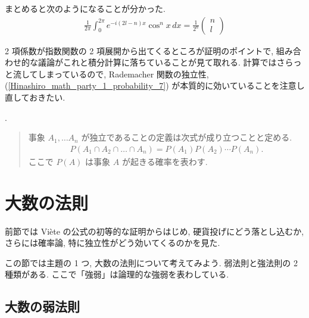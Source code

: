 \documentclass[openany, a4paper, oneside]{jsbook}
\begin{document}
{まとめると次のようになることが分かった.
\begin{align}
 \frac{1}{2 \pi} \int_0^{2 \pi} e^{-i (2l -n) x} \cos^n x \, dx
 =
 \frac{1}{2^n}
 \begin{pmatrix}
  n \\
  l
 \end{pmatrix} \label{Hinashiro_math_party_1_probability_9}
\end{align}

2 項係数が指数関数の 2 項展開から出てくるところが証明のポイントで,
組み合わせ的な議論がこれと積分計算に落ちていることが見て取れる.
計算ではさらっと流してしまっているので,
Rademacher 関数の独立性, (\ref{Hinashiro_math_party_1_probability_7}) が本質的に効いていることを注意し直しておきたい.}.
\begin{quote}
事象 $A_1, \dots A_n$ が独立であることの定義は次式が成り立つことと定める.
\begin{align}
 P (A_1 \cap A_2 \cap \dots \cap A_n)
 =
 P (A_1) P (A_2) \cdots P (A_n).
\end{align}
ここで $P (A)$ は事象 $A$ が起きる確率を表わす.
\end{quote}
\section{大数の法則}

前節では Vi\`ete の公式の初等的な証明からはじめ, 硬貨投げにどう落とし込むか,
さらには確率論, 特に独立性がどう効いてくるのかを見た.

この節では主題の 1 つ, 大数の法則について考えてみよう.
弱法則と強法則の 2 種類がある.
ここで「強弱」は論理的な強弱を表わしている.
\subsection{大数の弱法則}
\end{document}
